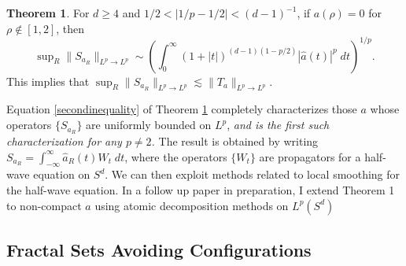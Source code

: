 \documentclass[11pt]{article}
\theoremstyle{definition}
\newtheorem{theorem}{Theorem}
\DeclareMathOperator{\RR}{\mathbb{R}}
\begin{document}

\begin{theorem} \label{characterization}
    For $d \geq 4$ and $1/2 < |1/p - 1/2| < (d-1)^{-1}$, if $a(\rho) = 0$ for $\rho \not \in [1,2]$, then
    \begin{equation} \label{secondinequality}
        \sup\nolimits_R \| S_{a_R} \|_{L^p \to L^p} \sim \left( \int_0^\infty ( 1 + |t| )^{(d-1)(1 - p/2)} | \widehat{a}(t) |^p\; dt \right)^{1/p}.
    \end{equation}
    This implies that $\sup\nolimits_R \| S_{a_R} \|_{L^p \to L^p} \lesssim \| T_a \|_{L^p \to L^p}$.
\end{theorem}

Equation \eqref{secondinequality} of Theorem \ref{characterization} completely characterizes those $a$ whose operators $\{ S_{a_R} \}$ are uniformly bounded on $L^p$, \emph{and is the first such characterization for any $p \neq 2$.} The result is obtained by writing $S_{a_R} = \int_{-\infty}^\infty \widehat{a}_R(t) W_t\; dt$, where the operators $\{ W_t \}$ are propagators for a half-wave equation on $S^d$. We can then exploit methods related to local smoothing for the half-wave equation. In a follow up paper in preparation, I extend Theorem 1 to non-compact $a$ using atomic decomposition methods on $L^p(S^d)$%

\subsection*{Fractal Sets Avoiding Configurations}
\end{document}
